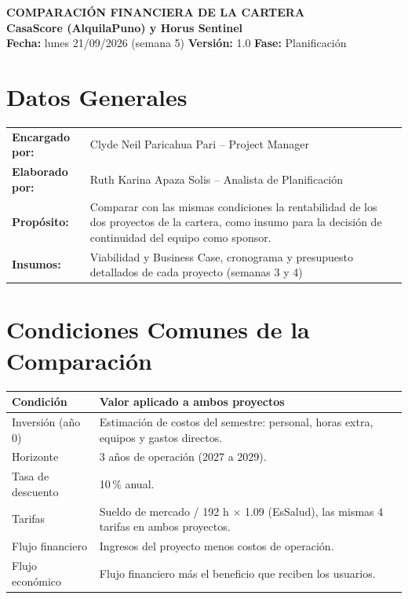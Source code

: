 \documentclass[11pt,a4paper]{article}
\begin{document}
\begin{center}
    {\Large \textbf{\textcolor{AzulUNA}{COMPARACIÓN FINANCIERA DE LA CARTERA}}}\\[3pt]
    {\normalsize \textbf{CasaScore (AlquilaPuno) y Horus Sentinel}}\\[4pt]
    \footnotesize \textbf{Fecha:} lunes 21/09/2026 (semana 5) \quad \textbar\quad \textbf{Versión:} 1.0 \quad \textbar\quad \textbf{Fase:} Planificación
\end{center}

\vspace{0.1cm}

\section{Datos Generales}
\noindent\begin{tabularx}{\textwidth}{@{}P{4.2cm} L@{}}
\toprule
\textbf{Encargado por:} & Clyde Neil Paricahua Pari -- Project Manager \\
\textbf{Elaborado por:} & Ruth Karina Apaza Solis -- Analista de Planificación \\
\textbf{Propósito:} & Comparar con las mismas condiciones la rentabilidad de los dos proyectos de la cartera, como insumo para la decisión de continuidad del equipo como sponsor. \\
\textbf{Insumos:} & Viabilidad y Business Case, cronograma y presupuesto detallados de cada proyecto (semanas 3 y 4) \\
\bottomrule
\end{tabularx}

\section{Condiciones Comunes de la Comparación}
{\small
{}
\noindent\begin{tabularx}{\textwidth}{@{}P{4.2cm} L@{}}
\toprule
{}
\textbf{Condición} & \textbf{Valor aplicado a ambos proyectos} \\
\midrule
Inversión (año 0) & Estimación de costos del semestre: personal, horas extra, equipos y gastos directos. \\
Horizonte & 3 años de operación (2027 a 2029). \\
Tasa de descuento & 10\,\% anual. \\
Tarifas & Sueldo de mercado / 192 h $\times$ 1.09 (EsSalud), las mismas 4 tarifas en ambos proyectos. \\
Flujo financiero & Ingresos del proyecto menos costos de operación. \\
Flujo económico & Flujo financiero más el beneficio que reciben los usuarios. \\
\bottomrule
\end{tabularx}
}
\end{document}
